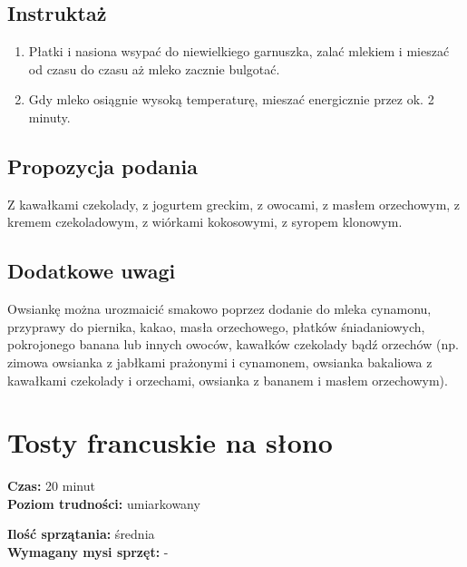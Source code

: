 \documentclass[a4paper,10pt]{book}
\begin{document}
\vspace{0.5cm} 

\subsection*{Instruktaż}
\begin{enumerate}
    \item Płatki i nasiona wsypać do niewielkiego garnuszka, zalać mlekiem i mieszać od czasu do czasu aż mleko zacznie bulgotać.
    \item Gdy mleko osiągnie wysoką temperaturę, mieszać energicznie przez ok. 2 minuty.
\end{enumerate}

\vspace{0.5cm} 

\small
\subsection*{Propozycja podania}
Z kawałkami czekolady, z jogurtem greckim, z owocami, z masłem orzechowym, z kremem czekoladowym, z wiórkami kokosowymi, z syropem klonowym.

\vspace{0.3cm}

\subsection*{Dodatkowe uwagi}
Owsiankę można urozmaicić smakowo poprzez dodanie do mleka cynamonu, przyprawy do piernika, kakao, masła orzechowego, płatków śniadaniowych, pokrojonego banana lub innych owoców, kawałków czekolady bądź orzechów (np. zimowa owsianka z jabłkami prażonymi i cynamonem, owsianka bakaliowa z kawałkami czekolady i orzechami, owsianka z bananem i masłem orzechowym).

\newpage 

\section{Tosty francuskie na słono}
\bigskip
\small
\begin{minipage}{0.45\textwidth}
    \noindent \textbf{Czas:} 20 minut \\
    \textbf{Poziom trudności:} umiarkowany
\end{minipage}
\begin{minipage}{0.45\textwidth}
    \noindent \textbf{Ilość sprzątania:} średnia\\
    \textbf{Wymagany mysi sprzęt:} -
\end{minipage}
\normalsize
\vspace{0.5cm}
\end{document}
